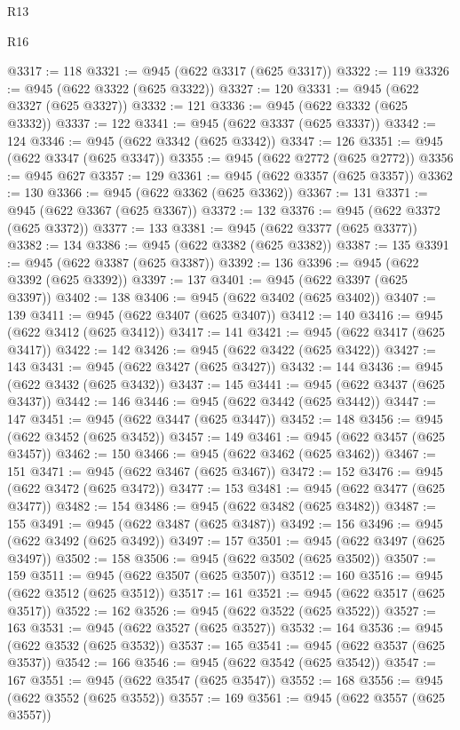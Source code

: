 \begin{lexlean}{R13}
\begin{lexlean}{R16}
\begin{coremodule}
{{{{{{{{{{{{{{{{{{{{{{{{{{{{{{{{{{{{{{{{{{{{{{{{{{{{{{{{{{{{{{{{{{{{{{{{{{{{{{{{{{{{{{{{{{{{{{{{{{{{{{{{{{{{{{{{{@3317 := 118
@3321 := @945 (@622 @3317 (@625 @3317))
@3322 := 119
@3326 := @945 (@622 @3322 (@625 @3322))
@3327 := 120
@3331 := @945 (@622 @3327 (@625 @3327))
@3332 := 121
@3336 := @945 (@622 @3332 (@625 @3332))
@3337 := 122
@3341 := @945 (@622 @3337 (@625 @3337))
@3342 := 124
@3346 := @945 (@622 @3342 (@625 @3342))
@3347 := 126
@3351 := @945 (@622 @3347 (@625 @3347))
@3355 := @945 (@622 @2772 (@625 @2772))
@3356 := @945 @627
@3357 := 129
@3361 := @945 (@622 @3357 (@625 @3357))
@3362 := 130
@3366 := @945 (@622 @3362 (@625 @3362))
@3367 := 131
@3371 := @945 (@622 @3367 (@625 @3367))
@3372 := 132
@3376 := @945 (@622 @3372 (@625 @3372))
@3377 := 133
@3381 := @945 (@622 @3377 (@625 @3377))
@3382 := 134
@3386 := @945 (@622 @3382 (@625 @3382))
@3387 := 135
@3391 := @945 (@622 @3387 (@625 @3387))
@3392 := 136
@3396 := @945 (@622 @3392 (@625 @3392))
@3397 := 137
@3401 := @945 (@622 @3397 (@625 @3397))
@3402 := 138
@3406 := @945 (@622 @3402 (@625 @3402))
@3407 := 139
@3411 := @945 (@622 @3407 (@625 @3407))
@3412 := 140
@3416 := @945 (@622 @3412 (@625 @3412))
@3417 := 141
@3421 := @945 (@622 @3417 (@625 @3417))
@3422 := 142
@3426 := @945 (@622 @3422 (@625 @3422))
@3427 := 143
@3431 := @945 (@622 @3427 (@625 @3427))
@3432 := 144
@3436 := @945 (@622 @3432 (@625 @3432))
@3437 := 145
@3441 := @945 (@622 @3437 (@625 @3437))
@3442 := 146
@3446 := @945 (@622 @3442 (@625 @3442))
@3447 := 147
@3451 := @945 (@622 @3447 (@625 @3447))
@3452 := 148
@3456 := @945 (@622 @3452 (@625 @3452))
@3457 := 149
@3461 := @945 (@622 @3457 (@625 @3457))
@3462 := 150
@3466 := @945 (@622 @3462 (@625 @3462))
@3467 := 151
@3471 := @945 (@622 @3467 (@625 @3467))
@3472 := 152
@3476 := @945 (@622 @3472 (@625 @3472))
@3477 := 153
@3481 := @945 (@622 @3477 (@625 @3477))
@3482 := 154
@3486 := @945 (@622 @3482 (@625 @3482))
@3487 := 155
@3491 := @945 (@622 @3487 (@625 @3487))
@3492 := 156
@3496 := @945 (@622 @3492 (@625 @3492))
@3497 := 157
@3501 := @945 (@622 @3497 (@625 @3497))
@3502 := 158
@3506 := @945 (@622 @3502 (@625 @3502))
@3507 := 159
@3511 := @945 (@622 @3507 (@625 @3507))
@3512 := 160
@3516 := @945 (@622 @3512 (@625 @3512))
@3517 := 161
@3521 := @945 (@622 @3517 (@625 @3517))
@3522 := 162
@3526 := @945 (@622 @3522 (@625 @3522))
@3527 := 163
@3531 := @945 (@622 @3527 (@625 @3527))
@3532 := 164
@3536 := @945 (@622 @3532 (@625 @3532))
@3537 := 165
@3541 := @945 (@622 @3537 (@625 @3537))
@3542 := 166
@3546 := @945 (@622 @3542 (@625 @3542))
@3547 := 167
@3551 := @945 (@622 @3547 (@625 @3547))
@3552 := 168
@3556 := @945 (@622 @3552 (@625 @3552))
@3557 := 169
@3561 := @945 (@622 @3557 (@625 @3557))
}}}}}}}}}}}}}}}}}}}}}}}}}}}}}}}}}}}}}}}}}}}}}}}}}}}}}}}}}}}}}}}}}}}}}}}}}}}}}}}}}}}}}}}}}}}}}}}}}}}}}}}}}}}}}}}}}
\end{coremodule}
\end{lexlean}
\end{lexlean}
